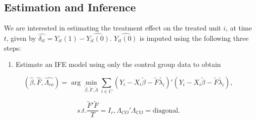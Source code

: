 \documentclass[12pt,nobind, a4paper]{reedthesis}
\providecommand{\tightlist}{%
	\setlength{\itemsep}{0pt}\setlength{\parskip}{0pt}}
\begin{document}
 \hypertarget{estimation-and-inference}{%
 \subsection{Estimation and Inference}\label{estimation-and-inference}}

 We are interested in estimating the treatment effect on the treated unit \(i\), at time \(t\), given by \(\hat{\delta_{it}}= Y_{it}(1)-\hat{Y_{it}(0)}\). \(\hat{Y_{it}(0)}\) is imputed using the following three steps:
 \linebreak
 \begin{enumerate}
 \def\labelenumi{\arabic{enumi}.}
 \tightlist
 \item
   Estimate an IFE model using only the control group data to obtain
 \end{enumerate}
 \[(\hat{\beta},\hat{F},\hat{\Lambda_{co}})=\arg\min_{\tilde{\beta},\tilde{F},\tilde{\Lambda}}\sum_{i\in C}(Y_{i}-X_{i} \tilde{\beta}-\tilde{F}\tilde{\lambda_{i}})'(Y_{i}-X_{i}\tilde{\beta}-\tilde{F}\tilde{\lambda_{i}}),\]

 \[s.t. \frac{\tilde{F}'\tilde{F}}{T}=I_{r}
 , \Lambda_{CO}'\Lambda_{CO}=\text{diagonal}.\]
\end{document}
